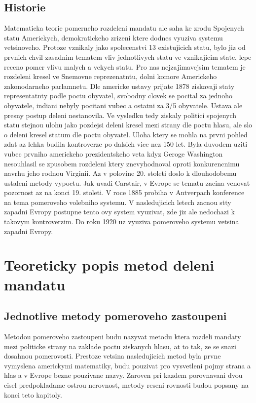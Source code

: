\documentclass[12pt,a4paper]{report}
\begin{document}
\section{Historie}
Matematicka teorie pomerneho rozdeleni mandatu ale saha ke zrodu Spojenych statu Americkych, demokratickeho zrizeni ktere dodnes vyuziva systemu vetsinoveho.\autocite{BAL2}
Protoze vznikaly jako spolecenstvi 13 existujicich statu, bylo jiz od prvnich chvil zasadnim tematem vliv jednotlivych statu ve vznikajicim state, lepe receno pomer vlivu malych a vekych statu.
Pro nas nejzajimavejsim tematem je rozdeleni kresel ve Snemovne reprezenatntu, dolni komore Americkeho zakonodarneho parlamnetu.
Dle americke ustavy prijate 1878 ziskavaji staty representatnty podle poctu obyvatel, svobodny clovek se pocital za jednoho obyvatele, indiani nebyly pocitani vubec a ostatni za 3/5 obyvatele.\autocite{CON}
Ustava ale presny postup deleni nestanovila.
Ve vysledku tedy ziskaly politici spojenych statu stejnou ulohu jako pozdejsi deleni kresel mezi strany dle poctu hlasu, ale slo o deleni kresel statum dle poctu obyvatel. 
Uloha ktery se mohla na prvni pohled zdat az lehka budila kontroverze po dalsich vice nez 150 let.
Byla duvodem uziti vubec prvniho americkeho prezidentskeho veta kdyz Geroge Washington nesouhlasil se zpusobem rozdeleni ktery znevyhodnoval oproti konkurencnimu navrhu jeho rodnou Virginii.\autocite{BAL1}
Az v polovine 20. stoleti doslo k dlouhodobemu ustaleni metody vypoctu.
Jak uvadi Carstair, v Evrope se tematu zacina venovat pozornost az na konci 19. stoleti.
V roce 1885 probiha v Antverpach konference na tema pomeroveho volebniho systemu.
V nasledujicich letech zacnou stty zapadni Evropy postupne tento ovy system vyuzivat, zde jiz ale nedochazi k takovym kontroverzim.
Do roku 1920 uz vyuziva pomeroveho systemu vetsina zapadni Evropy.\autocite{BOO}

\chapter{Teoreticky popis metod deleni mandatu}

\section{Jednotlive metody pomeroveho zastoupeni}
Metodou pomeroveho zastoupeni budu nazyvat metodu ktera rozdeli mandaty mezi politicke strany na zaklade poctu ziskanych hlasu, at to tak, ze se snazi dosahnou pomerovosti.
Prestoze vetsina nasledujicich metod byla prvne vymyslena americkymi matematiky, budu pouzivat pro vysvetleni pojmy strana a hlas a v Evrope bezne pouzivane nazvy.
Zaroven pri kazdem porovnavani dvou cisel predpokladame ostrou nerovnost, metody reseni rovnosti budou popsany na konci teto kapitoly.
\end{document}
